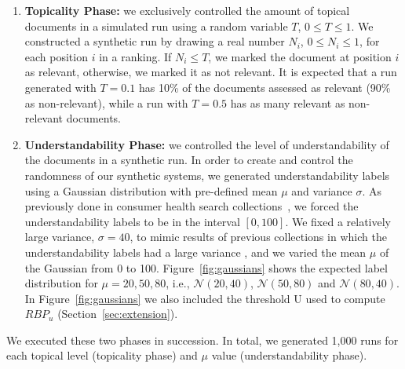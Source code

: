 
\begin{enumerate}
\item \textbf{Topicality Phase:} we exclusively controlled the amount of topical documents in a simulated run using a random variable $T$, $0 \le T \le 1$. 
We constructed a synthetic run by drawing a real number $N_i$, $0 \le N_i \le 1$, for each position $i$ in a ranking. If $N_i \le T$, we marked the document at position $i$ as relevant, otherwise, we marked it as not relevant. It is expected that a run generated with $T=0.1$ has 10\% of the documents assessed as relevant (90\% as non-relevant), while a run with $T=0.5$ has as many relevant as non-relevant documents. 

\item \textbf{Understandability Phase:}  we controlled the level of understandability of the documents in a synthetic run. In order to create and control the randomness of our synthetic systems, we generated understandability labels using a Gaussian distribution with pre-defined mean $\mu$ and variance $\sigma$. 
As previously done in consumer health search collections~\cite{clefIR16,clefIR17}, we forced the understandability labels to be in the interval $[0,100]$. 
We fixed a relatively large variance, $\sigma=40$, to mimic results of previous collections in which the understandability labels had a large variance \cite{clefIR16}, and we varied the mean $\mu$ of the Gaussian from 0 to 100. Figure~\ref{fig:gaussians} shows the expected label distribution for $\mu=20, 50, 80$, i.e., $\mathcal{N}(20, 40)$, $\mathcal{N}(50, 80)$ and $\mathcal{N}(80, 40)$.
In Figure~\ref{fig:gaussians} we also included the threshold U used to compute $RBP_u$ (Section~\ref{sec:extension}).
\end{enumerate}

We executed these two phases in succession. In total, we generated 1,000 runs for each topical level (topicality phase) and $\mu$ value (understandability phase). 


